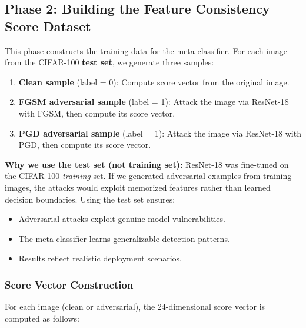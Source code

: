 \documentclass[12pt, a4paper]{article}
\begin{document}
\subsection{Phase 2: Building the Feature Consistency Score Dataset}

This phase constructs the training data for the meta-classifier. For each
image from the CIFAR-100 \textbf{test set}, we generate three samples:

\begin{enumerate}[nosep]
    \item \textbf{Clean sample} (label = 0): Compute score vector from
          the original image.
    \item \textbf{FGSM adversarial sample} (label = 1): Attack the image
          via ResNet-18 with FGSM, then compute its score vector.
    \item \textbf{PGD adversarial sample} (label = 1): Attack the image
          via ResNet-18 with PGD, then compute its score vector.
\end{enumerate}

\textbf{Why we use the test set (not training set):}
ResNet-18 was fine-tuned on the CIFAR-100 \emph{training} set. If we
generated adversarial examples from training images, the attacks would
exploit memorized features rather than learned decision boundaries. Using
the test set ensures:
\begin{itemize}[nosep]
    \item Adversarial attacks exploit genuine model vulnerabilities.
    \item The meta-classifier learns generalizable detection patterns.
    \item Results reflect realistic deployment scenarios.
\end{itemize}

\subsubsection{Score Vector Construction}

For each image (clean or adversarial), the 24-dimensional score vector is
computed as follows:
\end{document}
